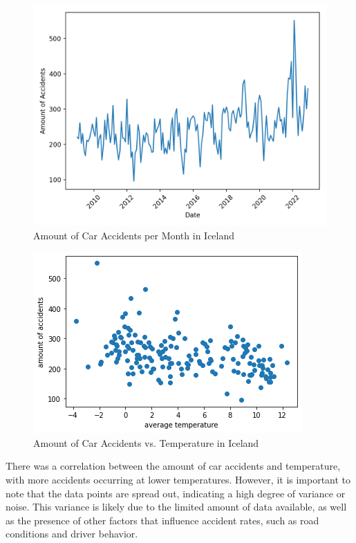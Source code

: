 \documentclass{article}
\begin{document}
\begin{figure}[h!]
    \centering
    \includegraphics[scale=0.5]{../figures/highres/isl_accidents_over_time.png}
    \caption{Amount of Car Accidents per Month in Iceland}
    \label{fig:accidents_per_month}
\end{figure}

\begin{figure}[h!]
    \centering
    \includegraphics[scale=0.5]{../figures/highres/isl_accidents_against_temp.png}
    \caption{Amount of Car Accidents vs. Temperature in Iceland}
    \label{fig:accidents_vs_temp}
\end{figure}


There was a correlation between the amount of car accidents and temperature, with more accidents occurring at lower temperatures. However, it is important to note that the data points are spread out, indicating a high degree of variance or noise. This variance is likely due to the limited amount of data available, as well as the presence of other factors that influence accident rates, such as road conditions and driver behavior.
\end{document}
